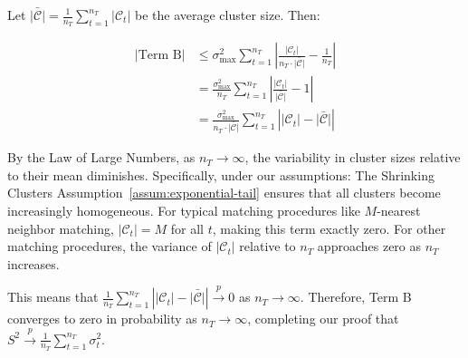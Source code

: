 \documentclass{mytemplate}
\begin{document}
Let $\bar{|\mathcal{C}|} = \frac{1}{n_T}\sum_{t=1}^{n_T}|\mathcal{C}_t|$ be the average cluster size. Then:

\begin{align*}
|\text{Term B}| &\leq \sigma_{\max}^2 \sum_{t=1}^{n_T}\left|\frac{|\mathcal{C}_t|}{n_T \cdot \bar{|\mathcal{C}|}} - \frac{1}{n_T}\right| \\
&= \frac{\sigma_{\max}^2}{n_T} \sum_{t=1}^{n_T}\left|\frac{|\mathcal{C}_t|}{\bar{|\mathcal{C}|}} - 1\right| \\
&= \frac{\sigma_{\max}^2}{n_T \cdot \bar{|\mathcal{C}|}} \sum_{t=1}^{n_T} \left||\mathcal{C}_t| - \bar{|\mathcal{C}|}\right|
\end{align*}

By the Law of Large Numbers, as $n_T \to \infty$, the variability in cluster sizes relative to their mean diminishes. Specifically, under our assumptions: The Shrinking Clusters Assumption~\ref{assum:exponential-tail} ensures that all clusters become increasingly homogeneous. For typical matching procedures like $M$-nearest neighbor matching, $|\mathcal{C}_t| = M$ for all $t$, making this term exactly zero.  For other matching procedures, the variance of $|\mathcal{C}_t|$ relative to $n_T$ approaches zero as $n_T$ increases.

This means that $\frac{1}{n_T} \sum_{t=1}^{n_T} \left||\mathcal{C}_t| - \bar{|\mathcal{C}|}\right| \xrightarrow{p} 0$ as $n_T \to \infty$. Therefore, Term B converges to zero in probability as $n_T \to \infty$, completing our proof that $S^2 \xrightarrow{p} \frac{1}{n_T} \sum_{t=1}^{n_T} \sigma_t^2$.
\end{document}
